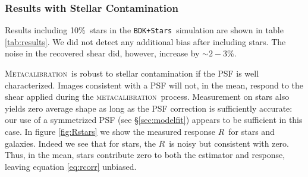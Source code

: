 \documentclass[iop, twocolappendix, appendixfloats, numberedappendix, apj]{emulateapj}
\newcommand{\snr}{$S/N$}
\newcommand{\mcal}{\textsc{metacalibration}}
\newcommand{\Mcal}{\textsc{Metacalibration}}
\newcommand{\mcalR}{\mbox{\boldmath $R$}}
\newcommand{\nsimNstarperc}{10\%}
\newcommand{\starnoiseincrease}{$\sim 2-3$\%}
\newcommand{\bdstar}{\texttt{BDK+Stars}}
\begin{document}

\subsubsection{Results with Stellar Contamination} \label{sec:stars}

Results including \nsimNstarperc\ stars in the \bdstar\ simulation are shown in
table \ref{tab:results}. We did not detect any additional bias after including
stars. The noise in the recovered shear did, however, increase by
\starnoiseincrease.

\Mcal\ is robust to stellar contamination if the PSF is well characterized.
Images consistent with a PSF will not, in the mean, respond to the shear
applied during the \mcal\ process.  Measurement on stars also yields zero
average shape as long as the PSF correction is sufficiently accurate: our use
of a symmetrized PSF (see \S \ref{sec:modelfit}) appears to be sufficient in
this case.  In figure \ref{fig:Rstars} we show the measured response \mcalR\
for stars and galaxies.  Indeed we see that for stars, the \mcalR\ is noisy
but consistent with zero.  Thus, in the mean, stars contribute zero to both the
estimator and response, leaving equation \ref{eq:rcorr} unbiased.
\end{document}
